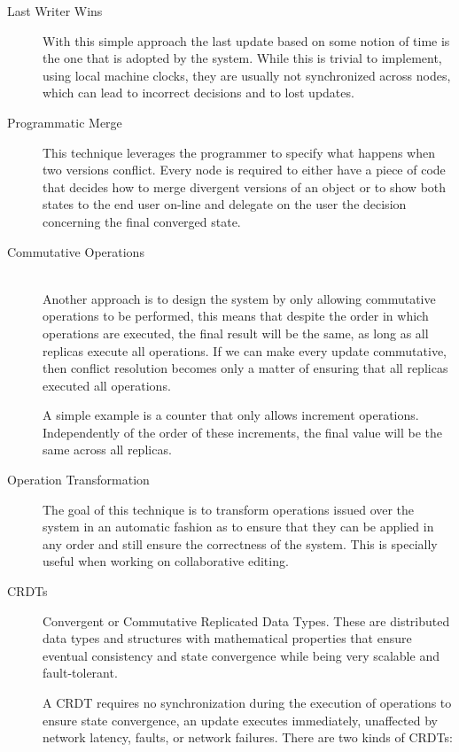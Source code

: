 \begin{description}
\item[Last Writer Wins] With this simple approach the last update based on some notion of time is the one that is adopted by the system. While this is trivial to implement, using local machine clocks, they are usually not synchronized across nodes, which can lead to incorrect decisions and to lost updates.
	
\item[Programmatic Merge] This technique leverages the programmer to specify what happens when two versions conflict. Every node is required to either have a piece of code that decides how to merge divergent versions of an object or to show both states to the end user on-line and delegate on the user the decision concerning the final converged state.

\item[Commutative Operations] \hfill \\
Another approach is to design the system by only allowing commutative operations to be performed, this means that despite the order in which operations are executed, the final result will be the same, as long as all replicas execute all operations. If we can make every update commutative, then conflict resolution becomes only a matter of ensuring that all replicas executed all operations.\par
	A simple example is a counter that only allows increment operations. Independently of the order of these increments, the final value will be the same across all replicas.
	
\item[Operation Transformation] The goal of this technique is to transform operations issued over the system in an automatic fashion as to ensure that they can be applied in any order and still ensure the correctness of the system. This is specially useful when working on collaborative editing.

\item[CRDTs] Convergent or Commutative Replicated Data Types. These are distributed data types and structures with mathematical properties that ensure eventual consistency and state convergence while being very scalable and fault-tolerant.\par
	A CRDT\cite{crdt} requires no synchronization during the execution of operations to ensure state convergence, an update executes immediately, unaffected by network latency, faults, or network failures. There are two kinds of CRDTs:\par
	

\end{description}
